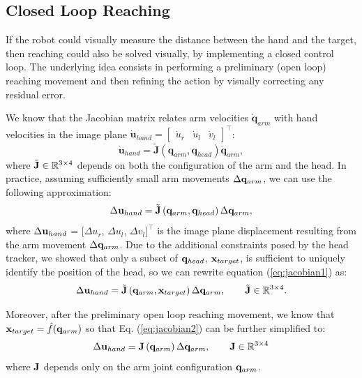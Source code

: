 \subsection{Closed Loop Reaching} \label{Eq:ClosedLoop}
%
If the robot could visually measure the distance
between the hand and the target, then reaching could also be solved
visually, by implementing a closed control loop. The underlying idea consists in
performing a preliminary (open loop) reaching movement and then refining the action
by visually correcting any residual error. 

We know that the Jacobian matrix relates arm velocities $\dot {\mathbf q}_{arm}$
with hand velocities in the image plane $\dot {\mathbf u}_{hand} = \left[ 
\begin{array}{ccc}
  \dot u_r & \dot u_l & \dot v_{l}
\end{array} \right]^\top$:
\begin{equation} 
  \dot {\mathbf u}_{hand}=
  \tilde{\mathbf J}\left(\mathbf q_{arm}, \mathbf q_{head}\right)
  \dot {\mathbf q}_{arm},
\end{equation}
where $\tilde{\mathbf J} \in \mathbb R^{3 \times 4}$ depends on 
both the configuration of the arm and the head. In practice, assuming 
sufficiently small arm movements $\Delta \mathbf {q}_{arm}$, we can use the following 
approximation:
%
\begin{equation} 
\label{eq:jacobian1}
  \deltauhand=
  \tilde{\mathbf J}\left(\mathbf q_{arm}, \mathbf q_{head}\right)
  \deltaqarm,
\end{equation}
where $\Delta \mathbf {u}_{hand}$ = $[ \Delta u_r$, $\Delta u_l$, $\Delta v_{l}]^\top$
is the image plane displacement resulting from the arm movement $\Delta \mathbf {q}_{arm}$. 
Due to the additional constraints posed by the head tracker, we showed
that only a subset of $\mathbf{q}_{head}$, $\mathbf{x}_{target}$, is 
sufficient to uniquely identify the position of the head, so we 
can rewrite equation (\ref{eq:jacobian1}) as:
%
\begin{equation}
\label{eq:jacobian2}
  \deltauhand=
  \tilde{\jacobian}\left(\qarm, \xtarget\right)
  \deltaqarm, \qquad \tilde{\jacobian} \in \mathbb R^{3 \times 4}.
\end{equation}
%

Moreover, after the preliminary open loop reaching movement, we know
that $\mathbf{x}_{target} = \hat f(\mathbf q_{arm})$ so that  Eq.
(\ref{eq:jacobian2}) can be further simplified to:
%
\begin{equation} 
\label{eq:jacobian3}
  \deltauhand=
  \jacobian \left(\qarm\right)
  \deltaqarm,\qquad \jacobian \in \mathbb R^{3\times4}
\end{equation}
%
where $\mathbf J$ depends only on the arm joint configuration $\mathbf q_{arm}$.

